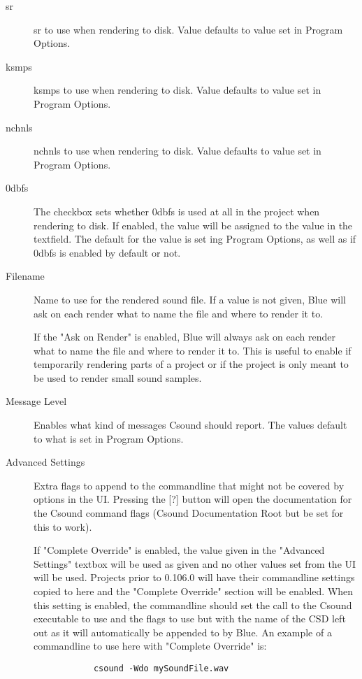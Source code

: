 \begin{description}
\item[sr]
sr to use when rendering to disk. Value defaults to value set in Program
Options.
\item[ksmps]
ksmps to use when rendering to disk. Value defaults to value set in
Program Options.
\item[nchnls]
nchnls to use when rendering to disk. Value defaults to value set in
Program Options.
\item[0dbfs]
The checkbox sets whether 0dbfs is used at all in the project when
rendering to disk. If enabled, the value will be assigned to the value
in the textfield. The default for the value is set ing Program Options,
as well as if 0dbfs is enabled by default or not.
\item[Filename]
Name to use for the rendered sound file. If a value is not given, Blue
will ask on each render what to name the file and where to render it to.

If the "Ask on Render" is enabled, Blue will always ask on each render
what to name the file and where to render it to. This is useful to
enable if temporarily rendering parts of a project or if the project is
only meant to be used to render small sound samples.
\item[Message Level]
Enables what kind of messages Csound should report. The values default
to what is set in Program Options.
\item[Advanced Settings]
Extra flags to append to the commandline that might not be covered by
options in the UI. Pressing the {[}?{]} button will open the
documentation for the Csound command flags (Csound Documentation Root
but be set for this to work).

If "Complete Override" is enabled, the value given in the "Advanced
Settings" textbox will be used as given and no other values set from the
UI will be used. Projects prior to 0.106.0 will have their commandline
settings copied to here and the "Complete Override" section will be
enabled. When this setting is enabled, the commandline should set the
call to the Csound executable to use and the flags to use but with the
name of the CSD left out as it will automatically be appended to by
Blue. An example of a commandline to use here with "Complete Override"
is:

\begin{verbatim}
            csound -Wdo mySoundFile.wav
          
\end{verbatim}
\end{description}

